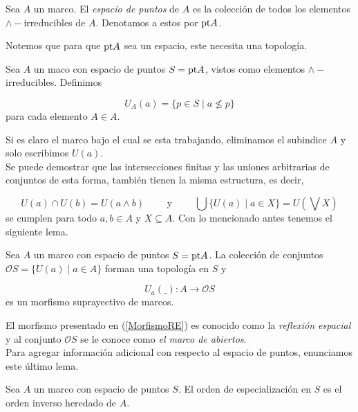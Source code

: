 \begin{dfn}\label{Espacio de puntos}
    Sea $A$ un marco. El \emph{espacio de puntos} de $A$ es la colección de todos los elementos $\wedge-$irreducibles de $A$. Denotamos a estos por $\mathrm{pt} A$.
\end{dfn}

Notemos que para que $\mathrm{pt} A$ sea un espacio, este necesita una topología.

\begin{dfn}\label{Reflexion espacial}
    Sea $A$ un maco con espacio de puntos $S=\mathrm{pt} A$, vistos como elementos $\wedge-$irreducibles. Definimos 

    \[
    U_A(a)=\{p\in S\mid a\nleq p\}
    \]
    para cada elemento $A\in A$. 
\end{dfn}

Si es claro el marco bajo el cual se esta trabajando, eliminamos el subindice $A$ y solo escribimos $U(a)$.\\

Se puede demostrar que las intersecciones finitas y las uniones arbitrarias de conjuntos de esta forma, también tienen la misma estructura, es decir,

\[
U(a)\cap U(b)=U(a\wedge b)\qquad\mbox{ y }\qquad\bigcup\{U(a)\mid a\in X\}=U\left(\bigvee X\right)
\]
se cumplen para todo $a, b\in A$ y $X\subseteq A$. Con lo mencionado antes tenemos el siguiente lema.

\begin{lem}\label{ReflexionEspacial}
    Sea $A$ un marco con espacio de puntos $S=\mathrm{pt} A$. La colección de conjuntos $\mathcal{O}S=\{U(a)\mid a\in A\}$ forman una topología en $S$ y 

    \begin{equation}\label{MorfismoRE}
            U_a(\_)\colon A\to \mathcal{O}S
    \end{equation}
    es un morfismo suprayectivo de marcos.
\end{lem}
El morfismo presentado en (\ref{MorfismoRE}) es conocido como la \emph{reflexión espacial} y al conjunto $\mathcal{O}S$ se le conoce como \emph{el marco de abiertos}.\\

Para agregar información adicional con respecto al espacio de puntos, enunciamos este último lema.

\begin{lem}\label{Topologiapt}
    Sea $A$ un marco con espacio de puntos $S$. El orden de especialización en $S$ es el orden inverso heredado de $A$. 
\end{lem}

